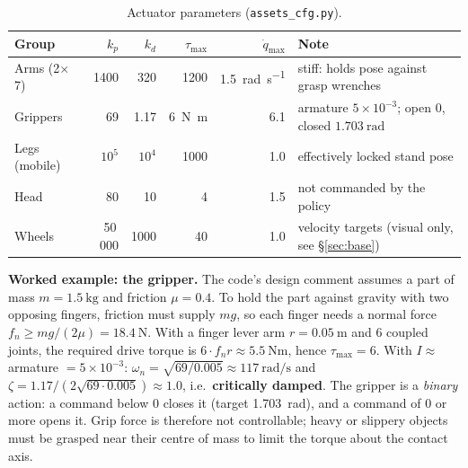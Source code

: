 \documentclass[10pt,a4paper]{article}
\begin{document}
\begin{table}[h]\centering\footnotesize
\begin{tabular}{@{}lrrrrl@{}}
\toprule
Group & $k_p$ & $k_d$ & $\tau_{\max}$ & $\dot q_{\max}$ & Note\\
\midrule
Arms (2$\times$7) & 1400 & 320 & 1200 & \SI{1.5}{\radian\per\second} & stiff: holds pose against grasp wrenches\\
Grippers & 69 & 1.17 & \SI{6}{\newton\metre} & 6.1 & armature $5\times10^{-3}$; open $0$, closed $\SI{1.703}{\radian}$\\
Legs (mobile) & $10^5$ & $10^4$ & 1000 & 1.0 & effectively locked stand pose\\
Head & 80 & 10 & 4 & 1.5 & not commanded by the policy\\
Wheels & 50\,000 & 1000 & 40 & 1.0 & velocity targets (visual only, see \S\ref{sec:base})\\
\bottomrule
\end{tabular}
\caption{Actuator parameters (\texttt{assets\_cfg.py}).}
\end{table}

\noindent\textbf{Worked example: the gripper.} The code's design comment assumes a part of mass $m=\SI{1.5}{\kilo\gram}$ and friction $\mu=0.4$. To hold the part against gravity with two opposing fingers, friction must supply $mg$, so each finger needs a normal force $f_n\ge mg/(2\mu)=\SI{18.4}{\newton}$. With a finger lever arm $r=\SI{0.05}{\metre}$ and 6 coupled joints, the required drive torque is $6\cdot f_n r\approx\SI{5.5}{\newton\metre}$, hence $\tau_{\max}=6$. With $I\approx$ armature $=5\times10^{-3}$: $\omega_n=\sqrt{69/0.005}\approx\SI{117}{\radian\per\second}$ and $\zeta=1.17/(2\sqrt{69\cdot0.005})\approx1.0$, i.e.\ \textbf{critically damped}. The gripper is a \emph{binary} action: a command below 0 closes it (target \SI{1.703}{\radian}), and a command of 0 or more opens it. Grip force is therefore not controllable; heavy or slippery objects must be grasped near their centre of mass to limit the torque about the contact axis.
\end{document}
